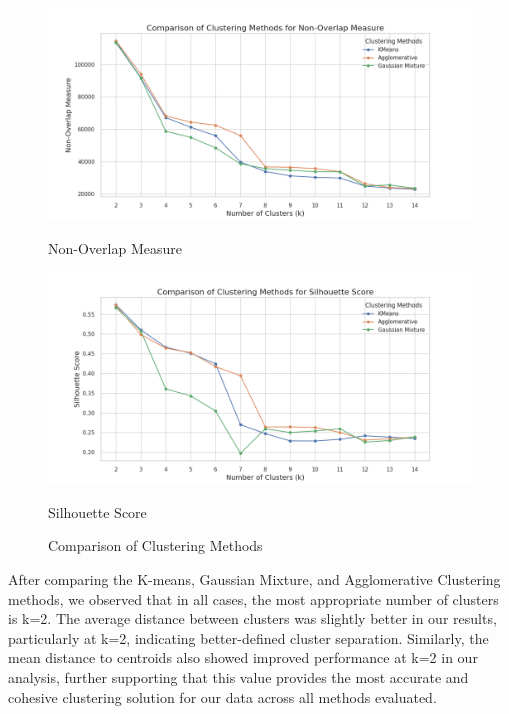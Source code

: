 \documentclass{article}
\begin{document}
\begin{figure}[H]
	\begin{minipage}{0.45\textwidth}
		\centering
		\includegraphics[width=\textwidth]{images/clustering_Non-Overlap Measure.png}
		\caption{Non-Overlap Measure}
		\label{fig:non_overlap}
	\end{minipage}\hfill
	\begin{minipage}{0.45\textwidth}
		\centering
		\includegraphics[width=\textwidth]{images/clustering_Silhouette Score.png}
		\caption{Silhouette Score}
		\label{fig:silhouette_score}
	\end{minipage}
	
	\caption{Comparison of Clustering Methods}
	\label{fig:clustering_methods}
\end{figure}

After comparing the K-means, Gaussian Mixture, and Agglomerative Clustering methods, we observed that in all cases, the most appropriate number of clusters is k=2. The average distance between clusters was slightly better in our results, particularly at k=2, indicating better-defined cluster separation. Similarly, the mean distance to centroids also showed improved performance at k=2 in our analysis, further supporting that this value provides the most accurate and cohesive clustering solution for our data across all methods evaluated.
 
\end{document}
